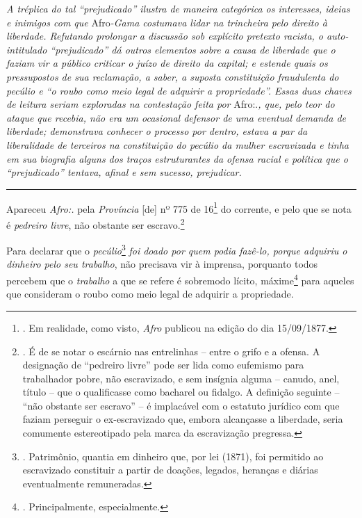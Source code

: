 \emph{A tréplica do tal ``prejudicado'' ilustra de maneira categórica os
interesses, ideias e inimigos com que} Afro\emph{-Gama costumava lidar
na trincheira pelo direito à liberdade. Refutando prolongar a discussão
sob explícito pretexto racista, o auto-intitulado ``prejudicado'' dá
outros elementos sobre a causa de liberdade que o faziam vir a público
criticar o juízo de direito da capital; e estende quais os pressupostos
de sua reclamação, a saber, a suposta constituição fraudulenta do
pecúlio e ``o roubo como meio legal de adquirir a propriedade''. Essas
duas chaves de leitura seriam exploradas na contestação feita por}
Afro:.\emph{, que, pelo teor do ataque que recebia, não era um ocasional
defensor de uma eventual demanda de liberdade; demonstrava conhecer o
processo por dentro, estava a par da liberalidade de terceiros na
constituição do pecúlio da mulher escravizada e tinha em sua biografia
alguns dos traços estruturantes da ofensa racial e política que o
``prejudicado'' tentava, afinal e sem sucesso, prejudicar. }

\begin{center}\rule{0.5\linewidth}{\linethickness}\end{center}

Apareceu \emph{Afro:.} pela \emph{Província} {[}de{]} nº 775 de
16\footnote{. Em realidade, como visto, \emph{Afro} publicou na edição
  do dia 15/09/1877.} do corrente, e pelo que se nota é \emph{pedreiro
livre}, não obstante ser escravo.\footnote{. É de se notar o escárnio
  nas entrelinhas -- entre o grifo e a ofensa. A designação de
  ``pedreiro livre'' pode ser lida como eufemismo para trabalhador
  pobre, não escravizado, e sem insígnia alguma -- canudo, anel, título
  -- que o qualificasse como bacharel ou fidalgo. A definição seguinte
  -- ``não obstante ser escravo'' -- é implacável com o estatuto
  jurídico com que faziam perseguir o ex-escravizado que, embora
  alcançasse a liberdade, seria comumente estereotipado pela marca da
  escravização pregressa.}

Para declarar que o \emph{pecúlio}\footnote{. Patrimônio, quantia em
  dinheiro que, por lei (1871), foi permitido ao escravizado constituir
  a partir de doações, legados, heranças e diárias eventualmente
  remuneradas.} \emph{foi doado por quem podia fazê-lo, porque adquiriu
o dinheiro pelo seu trabalho}, não precisava vir à imprensa, porquanto
todos percebem que o \emph{trabalho} a que se refere é sobremodo lícito,
máxime\footnote{. Principalmente, especialmente.} para aqueles que
consideram o roubo como meio legal de adquirir a propriedade.

